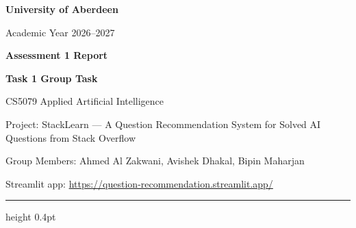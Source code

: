 \begin{singlespace}
\noindent
\begin{minipage}[t]{0.62\textwidth}
  \textbf{University of Aberdeen}
\end{minipage}\hfill
\begin{minipage}[t]{0.34\textwidth}
  \raggedleft
  Academic Year 2026--2027
\end{minipage}

\vspace{1.2em}
{\noindent\fontsize{18}{24}\selectfont\bfseries Assessment 1 Report\par}
{\noindent\fontsize{14}{24}\selectfont\bfseries Task 1 Group Task\par}
\vspace{0.25em}
{\noindent\large CS5079 Applied Artificial Intelligence\par}
\vspace{0.25em}
{\noindent\large Project: StackLearn --- A Question Recommendation System for Solved AI Questions from Stack Overflow\par}

\vspace{1em}
\noindent Group Members: Ahmed Al Zakwani, Avishek Dhakal, Bipin Maharjan\par
\vspace{0.3em}
\noindent Streamlit app: \url{https://question-recommendation.streamlit.app/}\par
\vspace{0.7em}
\hrule height 0.4pt
\end{singlespace}
\vspace{0.6em}
